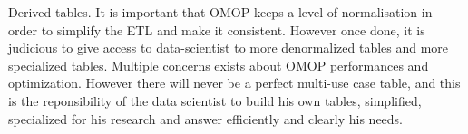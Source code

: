Derived tables. It is important that OMOP keeps a level of normalisation in
order to simplify the ETL and make it consistent. However once done, it is
judicious to give access to data-scientist to more denormalized tables and more
specialized tables. Multiple concerns exists about OMOP performances and
optimization. However there will never be a perfect multi-use case table, and
this is the reponsibility of the data scientist to build his own tables,
simplified, specialized for his research and answer efficiently and clearly his
needs.

